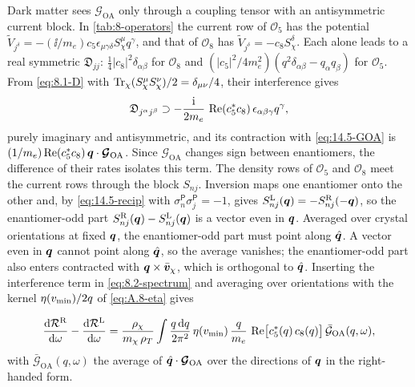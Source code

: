 Dark matter sees $\boldsymbol{\mathcal{G}}_{\mathrm{OA}}$ only through a coupling tensor with an antisymmetric current block. In \cref{tab:8-operators} the current row of $\mathcal{O}_5$ has the potential $\tilde V_{j^\delta} = -(\ii/m_e)c_5\epsilon_{\mu\gamma\delta}S^\mu_\chi q^\gamma$, and that of $\mathcal{O}_8$ has $\tilde V_{j^\delta} = -c_8S^\delta_\chi$. Each alone leads to a real symmetric $\mathfrak{D}_{jj}$: $\frac14|c_8|^2\delta_{\alpha\beta}$ for $\mathcal{O}_8$ and $(|c_5|^2/4m_e^2)(q^2\delta_{\alpha\beta} - q_\alpha q_\beta)$ for $\mathcal{O}_5$. From \cref{eq:8.1-D} with $\operatorname{Tr}_\chi(S^\mu_\chi S^\nu_\chi)/2 = \delta_{\mu\nu}/4$, their interference gives
\begin{equation*}
  \mathfrak{D}_{j^\alpha j^\beta} \supset -\frac{\mathrm{i}}{2m_e}\,\operatorname{Re}(c_5^*c_8)\,\epsilon_{\alpha\beta\gamma}q^\gamma ,
\end{equation*}
purely imaginary and antisymmetric, and its contraction with \cref{eq:14.5-GOA} is $(1/m_e)\operatorname{Re}(c_5^*c_8)\,\bm{q}\cdot\boldsymbol{\mathcal{G}}_{\mathrm{OA}}$. Since $\boldsymbol{\mathcal{G}}_{\mathrm{OA}}$ changes sign between enantiomers, the difference of their rates isolates this term. The density rows of $\mathcal{O}_5$ and $\mathcal{O}_8$ meet the current rows through the block $S_{nj}$. Inversion maps one enantiomer onto the other and, by \cref{eq:14.5-recip} with $\sigma^{\mathsf{P}}_n\sigma^{\mathsf{P}}_j = -1$, gives $S^{\mathrm{L}}_{nj}(\bm{q}) = -S^{\mathrm{R}}_{nj}(-\bm{q})$, so the enantiomer-odd part $S^{\mathrm{R}}_{nj}(\bm{q}) - S^{\mathrm{L}}_{nj}(\bm{q})$ is a vector even in $\bm{q}$. Averaged over crystal orientations at fixed $\bm{q}$, the enantiomer-odd part must point along $\hat{\bm{q}}$. A vector even in $\bm{q}$ cannot point along $\hat{\bm{q}}$, so the average vanishes; the enantiomer-odd part also enters contracted with $\bm{q}\times\bar{\bm{v}}_\chi$, which is orthogonal to $\hat{\bm{q}}$. Inserting the interference term in \cref{eq:8.2-spectrum} and averaging over orientations with the kernel $\eta(v_{\mathrm{min}})/2q$ of \cref{eq:A.8-eta} gives
\begin{keyresult}
\begin{equation}
  \frac{\mathrm{d}\mathcal{R}^{\mathrm{R}}}{\mathrm{d}\omega} - \frac{\mathrm{d}\mathcal{R}^{\mathrm{L}}}{\mathrm{d}\omega}
  = \frac{\rho_\chi}{m_{\chi}\,\rho_T}\int\frac{q\,\mathrm{d} q}{2\pi^2}\,\eta(v_{\mathrm{min}})\,\frac{q}{m_e}\,\operatorname{Re}\bigl[c_5^*(q)\,c_8(q)\bigr]\,\bar{\mathcal{G}}_{\mathrm{OA}}(q,\omega) ,
  \label{eq:14.5-enant}
\end{equation}
with $\bar{\mathcal{G}}_{\mathrm{OA}}(q,\omega)$ the average of $\hat{\bm{q}}\cdot\boldsymbol{\mathcal{G}}_{\mathrm{OA}}$ over the directions of $\bm{q}$ in the right-handed form.
\end{keyresult}
